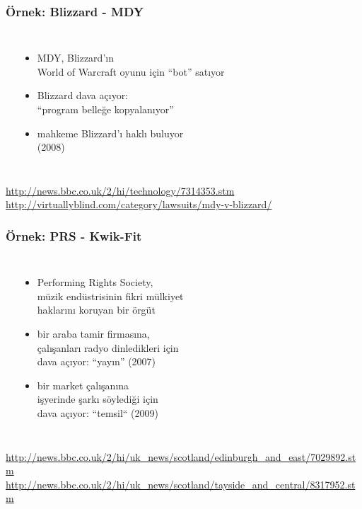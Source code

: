 \documentclass[dvipsnames]{beamer}
\theoremstyle{plain}
\begin{document}
\begin{frame}
  \frametitle{Örnek: Blizzard - MDY}

  \begin{columns}
    \begin{center}
    \end{center}

    \begin{itemize}
      \item MDY, Blizzard'ın\\
        World of Warcraft oyunu için ``bot'' satıyor
      \item Blizzard dava açıyor:\\
        ``program belleğe kopyalanıyor''
      \item mahkeme Blizzard'ı haklı buluyor\\
        (2008)
    \end{itemize}
  \end{columns}

  \medskip
  \tiny{\url{http://news.bbc.co.uk/2/hi/technology/7314353.stm}}\\
  \tiny{\url{http://virtuallyblind.com/category/lawsuits/mdy-v-blizzard/}}\\
\end{frame}

\begin{frame}
  \frametitle{Örnek: PRS - Kwik-Fit}

  \begin{columns}
    \begin{center}
    \end{center}

    \begin{itemize}
      \item Performing Rights Society,\\
        müzik endüstrisinin fikri mülkiyet\\
        haklarını koruyan bir örgüt
      \item bir araba tamir firmasına,\\
        çalışanları radyo dinledikleri için\\
        dava açıyor: ``yayın'' (2007)
      \item bir market çalışanına\\
        işyerinde şarkı söylediği için\\
        dava açıyor: ``temsil`` (2009)
    \end{itemize}
  \end{columns}

  \medskip
  \tiny{\url{http://news.bbc.co.uk/2/hi/uk_news/scotland/edinburgh_and_east/7029892.stm}}\\
  \tiny{\url{http://news.bbc.co.uk/2/hi/uk_news/scotland/tayside_and_central/8317952.stm}}\\
\end{frame}
\end{document}
